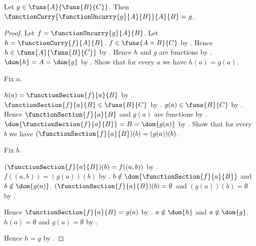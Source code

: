 \begin{proposition}\label{function_curry_uncurry}
    Let $g\in\funs{A}{\funs{B}{C}}$.
    Then $\functionCurry{\functionUncurry{g}{A}{B}}{A}{B}=g$.
\end{proposition}
\begin{proof}
    Let $f=\functionUncurry{g}{A}{B}$.
    Let $h=\functionCurry{f}{A}{B}$.
    $f\in\funs{A\times B}{C}$ by .
    Hence $h\in\funs{A}{\funs{B}{C}}$ by .
    Hence $h$ and $g$ are functions by .
    $\dom{h}=A=\dom{g}$ by .
    Show that for every $a$ we have $h(a)=g(a)$.
    \begin{subproof}
        Fix $a$.
        \begin{byCase}
                $h(a)=\functionSection{f}{a}{B}$
                    by .
                $\functionSection{f}{a}{B}\in\funs{B}{C}$
                    by .
                $g(a)\in\funs{B}{C}$ by .
                Hence $\functionSection{f}{a}{B}$ and $g(a)$ are functions
                    by .
                $\dom{\functionSection{f}{a}{B}}=B=\dom{g(a)}$
                    by .
                Show that for every $b$ we have
                    $(\functionSection{f}{a}{B})(b)=(g(a))(b)$.
                \begin{subproof}
                    Fix $b$.
                    \begin{byCase}
                            $(\functionSection{f}{a}{B})(b)=f((a,b))$
                                by .
                            $f((a,b))=(g(a))(b)$
                                by .
                            $b\notin\dom{\functionSection{f}{a}{B}}$ and
                                $b\notin\dom{g(a)}$.
                            $(\functionSection{f}{a}{B})(b)=\emptyset$ and
                                $(g(a))(b)=\emptyset$
                                by .
                    \end{byCase}
                \end{subproof}
                Hence $\functionSection{f}{a}{B}=g(a)$
                    by .
                $a\notin\dom{h}$ and $a\notin\dom{g}$.
                $h(a)=\emptyset$ and $g(a)=\emptyset$
                    by .
        \end{byCase}
    \end{subproof}
    Hence $h=g$ by .
\end{proof}

